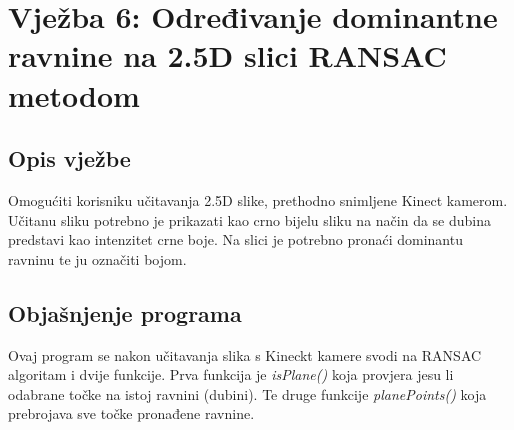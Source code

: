 \setcounter{figure}{0}
\setcounter{lstlisting}{0}
\section{Vježba 6: Određivanje dominantne ravnine na 2.5D slici RANSAC
metodom}

\subsection{Opis vježbe}
Omogućiti korisniku učitavanja 2.5D slike, prethodno snimljene Kinect
kamerom. Učitanu sliku potrebno je prikazati kao crno bijelu sliku na
način da se dubina predstavi kao intenzitet crne boje. Na slici je
potrebno pronaći dominantu ravninu te ju označiti bojom.
\\

\subsection{Objašnjenje programa}
Ovaj program se nakon učitavanja slika s Kineckt kamere svodi na RANSAC
algoritam i dvije funkcije. Prva funkcija je \textit{isPlane()} koja
provjera jesu li odabrane točke na istoj ravnini (dubini). Te druge
funkcije \textit{planePoints()} koja prebrojava sve točke pronađene
ravnine.
